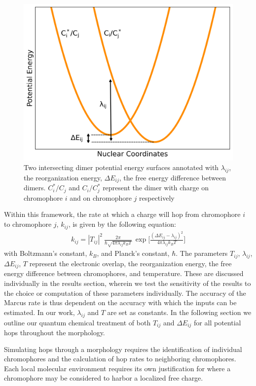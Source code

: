 \begin{figure}
  \center
  \includegraphics[width=0.7\linewidth]{figures/marcus-plot.png} 
    \caption{Two intersecting dimer potential energy surfaces annotated with $\lambda_{ij}$, the
    reorganization energy, $\Delta E_{ij}$, the free energy difference between dimers. $C_{i}^*/C_{j}$ 
    and $C_{i}/C_{j}^*$ represent the dimer with charge on chromophore $i$ and on
    chromophore $j$ respectively}
  \label{marcus-plot}
\end{figure}

Within this framework, the rate at which a charge will hop from chromophore $i$ to chromophore $j$, $k_{ij}$,
is given by the following equation:
\begin{align}
    k_{ij}  =  |T_{ij}|^2\ \frac{2\pi}{\hbar \sqrt{4 \pi \lambda_{ij} k_{B} T}}\ \exp{\Bigg[ \frac{(\Delta
    E_{ij} - \lambda_{ij})^2}{ 4 \pi \lambda_{ij} k_{B} T} \Bigg] }
    \label{marcus}
\end{align}
with Boltzmann's constant, $k_{B}$, and Planck's constant, $\hbar$. The parameters $T_{ij}$, $\lambda_{ij}$,
$\Delta E_{ij}$, $T$ represent the electronic overlap, the reorganization energy, the free energy difference
between chromophores, and
temperature. These are discussed individually in the results section, wherein we test the sensitivity of
the  results to the choice or computation of these parameters individually.
The accuracy of the Marcus rate is thus dependent on the accuracy with which the inputs can be estimated. In
our work, $\lambda_{ij}$ and $T$ are set as constants. In
the following section we outline our quantum chemical treatment of both $T_{ij}$ and $\Delta E_{ij}$ for all
potential hops throughout the morphology.

Simulating hops through a morphology requires the identification of
individual chromophores and the calculation of hop rates to neighboring
chromophores. 
Each local molecular environment requires its own justification for where a chromophore 
may be considered to harbor a localized free charge.

